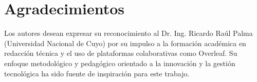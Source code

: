 \documentclass[12pt,a4paper]{article}
\begin{document}
\section*{Agradecimientos}

Los autores desean expresar su reconocimiento al Dr. Ing. Ricardo Raúl Palma (Universidad Nacional de Cuyo) por su impulso a la formación académica en redacción técnica y el uso de plataformas colaborativas como Overleaf. Su enfoque metodológico y pedagógico orientado a la innovación y la gestión tecnológica ha sido fuente de inspiración para este trabajo.





\end{document}
